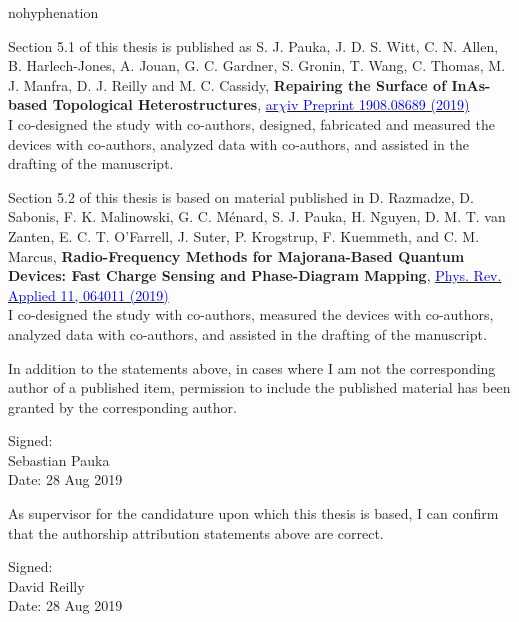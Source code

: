 \begin{hyphenrules}{nohyphenation}
\begin{sloppypar}
      \noindent
      Section 5.1 of this thesis is published as S. J. Pauka, J. D. S. Witt, C. N. Allen, B. Harlech-Jones, A. Jouan, G. C. Gardner, S. Gronin, T. Wang, C. Thomas, M. J. Manfra, D. J. Reilly and M. C. Cassidy,
      \textbf{Repairing the Surface of InAs-based Topological Heterostructures},
      \href{https://arxiv.org/abs/1908.08689}{\textcolor{blue}{ar$χ$iv Preprint 1908.08689 (2019)}} \\
      I co-designed the study with co-authors, designed, fabricated and measured the devices with co-authors, analyzed data with co-authors, and assisted in the drafting of the manuscript.

      \noindent
      Section 5.2 of this thesis is based on material published in D. Razmadze, D. Sabonis, F. K. Malinowski, G. C. Ménard, S. J. Pauka, H. Nguyen, D. M. T. van Zanten, E. C. T. O'Farrell, J. Suter, P. Krogstrup, F. Kuemmeth, and C. M. Marcus,
      \textbf{Radio-Frequency Methods for Majorana-Based Quantum Devices: Fast Charge Sensing and Phase-Diagram Mapping},
      \href{https://doi.org/\detokenize{10.1103/PhysRevApplied.11.064011}}{\textcolor{blue}{Phys. Rev. Applied 11, 064011 (2019)}} \\
      I co-designed the study with co-authors, measured the devices with co-authors, analyzed data with co-authors, and assisted in the drafting of the manuscript.

      \noindent
      In addition to the statements above, in cases where I am not the corresponding author of a published item, permission to include the published material has been granted by the corresponding author.

      \vspace{2em}
      \hspace*{0mm}Signed:\vspace{2pt}\dashsign\\
      \hspace*{0mm}\phantom{Signed: }Sebastian Pauka\\
      \hspace*{0mm}\phantom{Signed: }Date: 28 Aug 2019

      \noindent
      As supervisor for the candidature upon which this thesis is based, I can confirm that the authorship attribution statements above are correct.

      \vspace{2em}
      \hspace*{0mm}Signed:\vspace{2pt}\dashsign\\
      \hspace*{0mm}\phantom{Signed: }David Reilly\\
      \hspace*{0mm}\phantom{Signed: }Date: 28 Aug 2019

      \makeatletter
      \let\parskip=\old@parskip
      \makeatother
  \end{sloppypar}
\end{hyphenrules}
\newpage\null\newpage

\makeatletter
\let\chapter\old@chapter
\let\@makeschapterhead\old@makeschapterhead
\makeatother